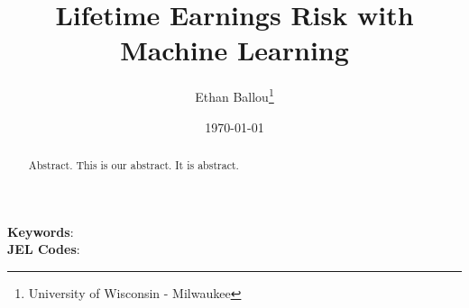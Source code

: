 \documentclass[12pt]{article}
\title{Lifetime Earnings Risk with Machine Learning}
\author{Ethan Ballou\thanks{University of Wisconsin - Milwaukee}}
\date{\today}
\begin{document}
\maketitle
\thispagestyle{empty}



\begin{abstract}
\begin{singlespace}
\noindent 
Abstract.  This is our abstract.  It is abstract.  
\end{singlespace}
\end{abstract}
\noindent
\textbf{Keywords}: \\
\textbf{JEL Codes}: \\






\clearpage
\setcounter{page}{1}
\end{document}
